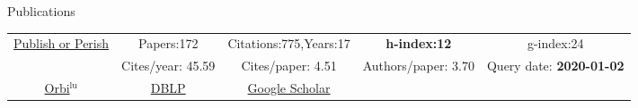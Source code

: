 \begin{rubrique}{Publications}

  {\footnotesize

    \vspace*{-2em}
    \begin{center}
      \begin{tabular}{|c||cccc|}
        \hline
        \multirow{2}{4em}{\href{http://www.harzing.com/pop.htm}{Publish or Perish}}
        & Papers:172        & Citations:775,Years:17   & \textbf{h-index:12} & g-index:24 \\
        & Cites/year: 45.59 & Cites/paper: 4.51        & Authors/paper: 3.70 & Query date: \textbf{2020-01-02}\\
        \hline
        \href{https://orbilu.uni.lu/simple-search?query=varrette}{Orbi$^\text{lu}$} &
        \multicolumn{1}{c|}{\href{http://www.informatik.uni-trier.de/~ley/pers/hd/v/Varrette:S=eacute=bastien.html}{DBLP}} &                                                                                                \multicolumn{1}{c|}{\href{https://scholar.google.fr/citations?hl=fr\&user=6PTStIcAAAAJ\&view_op=list_works\&sortby=pubdate}{Google Scholar}}\\
        \cline{1-3}
      \end{tabular}
    \end{center}
  }




\end{rubrique}





%
